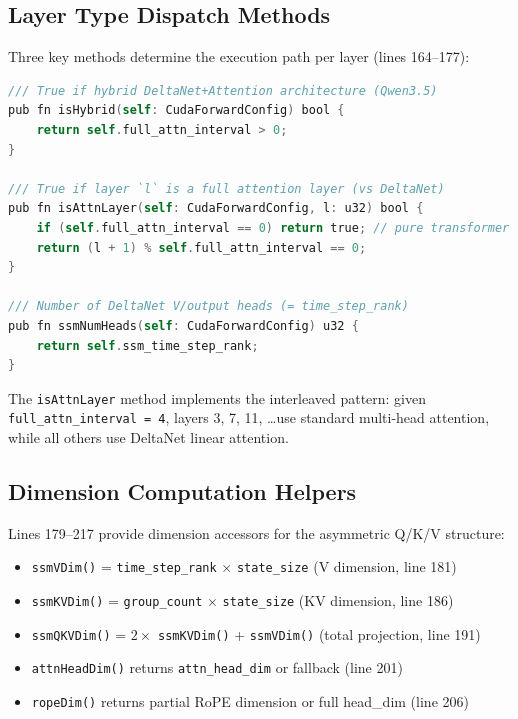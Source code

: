 \documentclass[11pt]{article}
\begin{document}
\subsection{Layer Type Dispatch Methods}

Three key methods determine the execution path per layer (lines 164--177):

\begin{lstlisting}[language=C,caption={Hybrid dispatch methods (cuda\_forward.zig:164--177)}]
/// True if hybrid DeltaNet+Attention architecture (Qwen3.5)
pub fn isHybrid(self: CudaForwardConfig) bool {
    return self.full_attn_interval > 0;
}

/// True if layer `l` is a full attention layer (vs DeltaNet)
pub fn isAttnLayer(self: CudaForwardConfig, l: u32) bool {
    if (self.full_attn_interval == 0) return true; // pure transformer
    return (l + 1) % self.full_attn_interval == 0;
}

/// Number of DeltaNet V/output heads (= time_step_rank)
pub fn ssmNumHeads(self: CudaForwardConfig) u32 {
    return self.ssm_time_step_rank;
}
\end{lstlisting}

The \texttt{isAttnLayer} method implements the interleaved pattern: given
\texttt{full\_attn\_interval = 4}, layers 3, 7, 11, \ldots use standard
multi-head attention, while all others use DeltaNet linear attention.

\subsection{Dimension Computation Helpers}

Lines 179--217 provide dimension accessors for the asymmetric Q/K/V structure:

\begin{itemize}
  \item \texttt{ssmVDim()} = \texttt{time\_step\_rank} $\times$ \texttt{state\_size} (V dimension, line 181)
  \item \texttt{ssmKVDim()} = \texttt{group\_count} $\times$ \texttt{state\_size} (KV dimension, line 186)
  \item \texttt{ssmQKVDim()} = $2 \times$ \texttt{ssmKVDim()} + \texttt{ssmVDim()} (total projection, line 191)
  \item \texttt{attnHeadDim()} returns \texttt{attn\_head\_dim} or fallback (line 201)
  \item \texttt{ropeDim()} returns partial RoPE dimension or full head\_dim (line 206)
\end{itemize}
\end{document}
